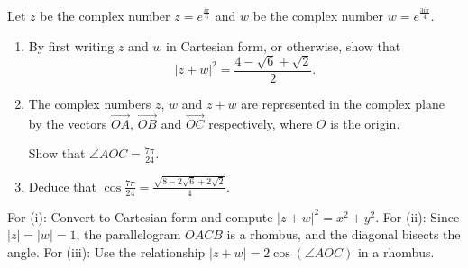 \begin{problem}
Let $z$ be the complex number $z = e^{\frac{i\pi}{6}}$ and $w$ be the complex number $w = e^{\frac{3i\pi}{4}}$.

\begin{enumerate}
    \item[(i)] By first writing $z$ and $w$ in Cartesian form, or otherwise, show that
    \[
    |z + w|^2 = \frac{4 - \sqrt{6} + \sqrt{2}}{2}.
    \]

    \item[(ii)] The complex numbers $z$, $w$ and $z + w$ are represented in the complex plane by the vectors $\overrightarrow{OA}$, $\overrightarrow{OB}$ and $\overrightarrow{OC}$ respectively, where $O$ is the origin.
    
    Show that $\angle AOC = \frac{7\pi}{24}$.

    \item[(iii)] Deduce that $\cos \frac{7\pi}{24} = \frac{\sqrt{8 - 2\sqrt{6} + 2\sqrt{2}}}{4}$.
\end{enumerate}
\end{problem}

\begin{hint}
For (i): Convert to Cartesian form and compute $|z+w|^2 = x^2+y^2$. For (ii): Since $|z|=|w|=1$, the parallelogram $OACB$ is a rhombus, and the diagonal bisects the angle. For (iii): Use the relationship $|z+w| = 2\cos(\angle AOC)$ in a rhombus.
\end{hint}

